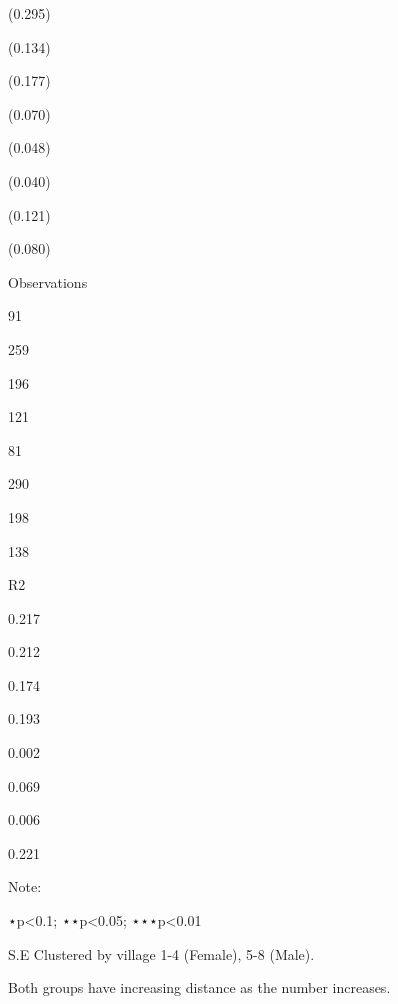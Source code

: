 \documentclass[
]{article}
\begin{document}
(0.295)

(0.134)

(0.177)

(0.070)

(0.048)

(0.040)

(0.121)

(0.080)

Observations

91

259

196

121

81

290

198

138

R2

0.217

0.212

0.174

0.193

0.002

0.069

0.006

0.221

Note:

⋆p\textless0.1; ⋆⋆p\textless0.05; ⋆⋆⋆p\textless0.01

S.E Clustered by village 1-4 (Female), 5-8 (Male).

Both groups have increasing distance as the number increases.
\end{document}
